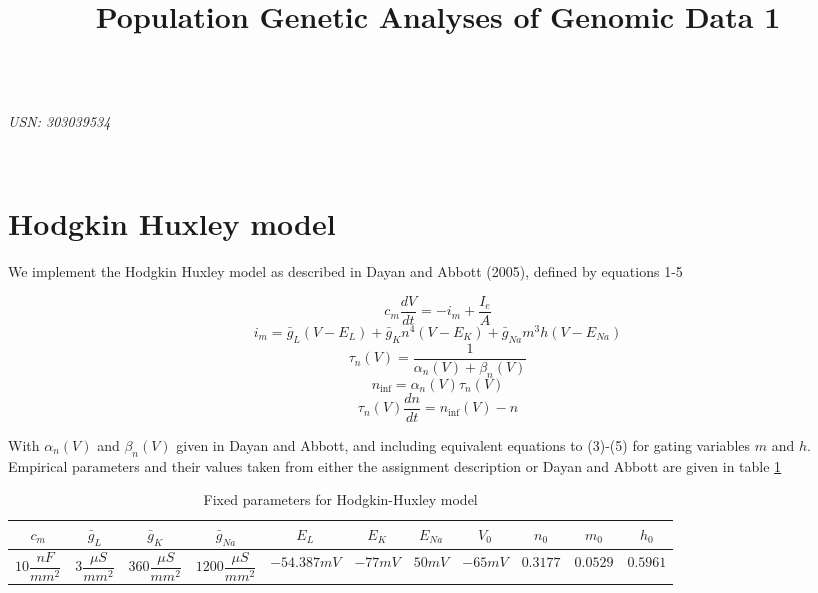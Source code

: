 \documentclass{article}
\title{Population Genetic Analyses of Genomic Data 1}
\begin{document}

\begin{center}
\textbf{\Large{}}\\
\textit{USN: 303039534}\\
\end{center}

~\\


\section{Hodgkin Huxley model}

We implement the Hodgkin Huxley model as described in Dayan and Abbott (2005), defined by equations 1-5



\begin{equation}
c_m \dfrac{dV}{dt} = -i_m + \dfrac{I_e}{A}
\end{equation}
\begin{equation}
i_m = \bar g_L(V-E_L)+ \bar g_Kn^4(V-E_K)+ \bar g_{Na}m^3h(V-E_{Na})
\end{equation}
\begin{equation}
\tau_n(V) = \dfrac{1}{\alpha_n(V) + \beta_n(V)}
\end{equation}
\begin{equation}
n_{\inf} = \alpha_n(V)\tau_n(V)
\end{equation}
\begin{equation}
\tau_n(V)\dfrac{dn}{dt}=n_{\inf}(V)-n
\end{equation}

With $\alpha_n(V)$ and $\beta_n(V)$ given in Dayan and Abbott, and including equivalent equations to (3)-(5) for gating variables $m$ and $h$.
Empirical parameters and their values taken from either the assignment description or Dayan and Abbott are given in table \ref{tab:paramshh}

\begin{table}[h]
\centering
\begin{tabular}{ |c|c|c|c|c|c|c|c|c|c|c|}
\hline
 $c_m$ &  $\bar g_L$ & $\bar g_K$ & $\bar g_{Na}$ & $E_L$ & $E_K$ & $E_{Na}$ & $V_0$ & $n_0$ & $m_0$ & $h_0$ \\
\hline
$10 \dfrac{nF}{mm^2}$ & $ 3\dfrac{\mu S}{mm^2} $ & $ 360\dfrac{\mu S}{mm^2} $& $ 1200\dfrac{\mu S}{mm^2} $& $-54.387 mV$ & $-77 mV$ & $50 mV$ & $-65 mV$ & $0.3177$ & $0.0529$ & $0.5961$ \\
\hline
\end{tabular}
\caption{Fixed parameters for Hodgkin-Huxley model}
\label{tab:paramshh}
\end{table}
\end{document}

